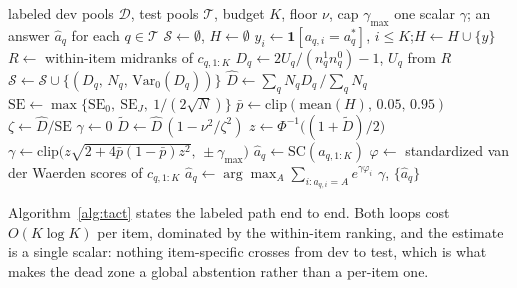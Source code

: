 \documentclass[twoside,11pt]{article}
\newcommand{\Dhat}{\widehat{D}}
\newcommand{\TACT}{\textsc{tact}}
\begin{document}
\begin{algorithm}[t]
\caption{\TACT{}: derive the exponent, then vote}
\label{alg:tact}
\begin{algorithmic}[1]
\Require labeled dev pools $\mathcal{D}$, test pools $\mathcal{T}$, budget $K$,
floor $\nu$, cap $\gamma_{\max}$
\Ensure one scalar $\gamma$; an answer $\hat a_q$ for each $q\in\mathcal{T}$
\State $\mathcal{S}\gets\emptyset$,\; $H\gets\emptyset$
  \State $y_i\gets\mathbf{1}[a_{q,i}=a^\ast_q]$,\; $i\le K$;\quad $H\gets H\cup\{y\}$
   
    \State $R\gets$ within-item midranks of $c_{q,1:K}$
    \State $D_q\gets 2U_q/(n^1_qn^0_q)-1$, \; $U_q$ from $R$
    \State $\mathcal{S}\gets\mathcal{S}\cup\{(D_q,\,N_q,\,\mathrm{Var}_0(D_q))\}$
  \EndIf
\EndFor
\State $\Dhat\gets\sum_q N_qD_q\,/\sum_q N_q$ 
\State $\mathrm{SE}\gets\max\{\mathrm{SE}_0,\ \mathrm{SE}_J,\ 1/(2\sqrt{N})\}$
\State $\bar p\gets\mathrm{clip}(\mathrm{mean}(H),\,0.05,\,0.95)$
\State $\zeta\gets\Dhat/\mathrm{SE}$
\If{$|\zeta|\le\nu$} 
  \State $\gamma\gets 0$
\Else
  \State $\tilde D\gets\Dhat\,(1-\nu^2/\zeta^2)$ 
  \State $z\gets\Phi^{-1}\big((1+\tilde D)/2\big)$
  \State $\gamma\gets\mathrm{clip}\big(z\sqrt{2+4\bar p(1-\bar p)z^2},\,\pm\gamma_{\max}\big)$
\EndIf
{}
    \State $\hat a_q\gets\mathrm{SC}(a_{q,1:K})$ 
  \Else
    \State $\varphi\gets$ standardized van der Waerden scores of $c_{q,1:K}$
    \State $\hat a_q\gets\arg\max_A\sum_{i:a_{q,i}=A}e^{\gamma\varphi_i}$
  \EndIf
\EndFor
\State \Return $\gamma$, $\{\hat a_q\}$
\end{algorithmic}
\end{algorithm}

Algorithm~\ref{alg:tact} states the labeled path end to end. Both loops cost
$O(K\log K)$ per item, dominated by the within-item ranking, and the estimate
is a single scalar: nothing item-specific crosses from dev to test, which is
what makes the dead zone a global abstention rather than a per-item one.
\end{document}
